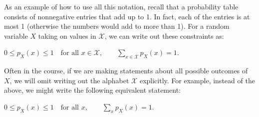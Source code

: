 \documentclass[6008notes.tex]{subfiles}
\begin{document}
As an example of how to use all this notation, recall that a probability table consists of nonnegative entries that add up to 1. In fact, each of the entries is at most 1 (otherwise the numbers would add to more than 1). For a random variable $X$ taking on values in $\mathcal{X}$, we can write out these constraints as:

{\centering$0 \le p_ X(x) \le 1\quad \text {for all }x\in \mathcal{X}, \qquad \sum _{x \in \mathcal{X}} p_ X(x) = 1.$ \par}
 
Often in the course, if we are making statements about all possible outcomes of $X$, we will omit writing out the alphabet $\mathcal{X}$ explicitly. For example, instead of the above, we might write the following equivalent statement:

{\centering$0 \le p_ X(x) \le 1\quad \text {for all }x, \qquad \sum _ x p_ X(x) = 1.$ \par}
\end{document}
